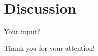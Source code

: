 \section{Discussion}
\label{sec:discussion}

\begin{frame}
Your input?
\end{frame}

\begin{frame}
Thank you for your attention!
\end{frame}
